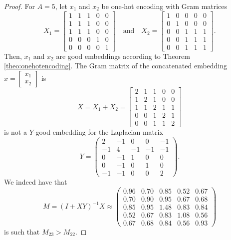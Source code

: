 \documentclass[10pt,a4paper]{amsart}
\begin{document}
\begin{proof}
For $A=5$, let $x_1$ and $x_2$ be one-hot encoding with Gram matrices
    \[
X_1 =
\begin{bmatrix}
1 & 1 & 1 & 0 & 0 \\
1 & 1 & 1 & 0 & 0 \\
1 & 1 & 1 & 0 & 0 \\
0 & 0 & 0 & 1 & 0 \\
0 & 0 & 0 & 0 & 1
\end{bmatrix} \quad \text{and} \quad
X_2 =
\begin{bmatrix}
1 & 0 & 0 & 0 & 0 \\
0 & 1 & 0 & 0 & 0 \\
0 & 0 & 1 & 1 & 1 \\
0 & 0 & 1 & 1 & 1 \\
0 & 0 & 1 & 1 & 1
\end{bmatrix}.
\]
Then, $x_1$ and $x_2$ are good embeddings according to  Theorem \ref{theo:onehotencoding}. The Gram matrix of the concatenated embedding $x = \begin{bmatrix}
    x_1 \\ x_2
\end{bmatrix}$ is
$$
X = X_1 + X_2 =
\begin{bmatrix}
2 & 1 & 1 & 0 & 0 \\
1 & 2 & 1 & 0 & 0 \\
1 & 1 & 2 & 1 & 1 \\
0 & 0 & 1 & 2 & 1 \\
0 & 0 & 1 & 1 & 2
\end{bmatrix} 
$$
is not a $Y$-good embedding for the Laplacian matrix
$$Y = \begin{pmatrix} 2 & -1 & 0 & 0 & -1 \\ -1 & 4 & -1 & -1 & -1 \\ 0 & -1 & 1 & 0 & 0 \\ 0 & -1 & 0 & 1 & 0 \\ -1 & -1 & 0 & 0 & 2 \end{pmatrix}.$$
We indeed have that
$$M = (I + XY)^{-1} X \approx \begin{pmatrix} 0.96 & 0.70 & 0.85 & 0.52 & 0.67 \\ 0.70 & 0.90 & 0.95 & 0.67 & 0.68 \\ 0.85 & 0.95 & 1.48 & 0.83 & 0.84 \\ 0.52 & 0.67 & 0.83 & 1.08 & 0.56 \\ 0.67 & 0.68 & 0.84 & 0.56 & 0.93 \end{pmatrix}$$
is such that $M_{23} > M_{22}$.
\end{proof}
\end{document}
